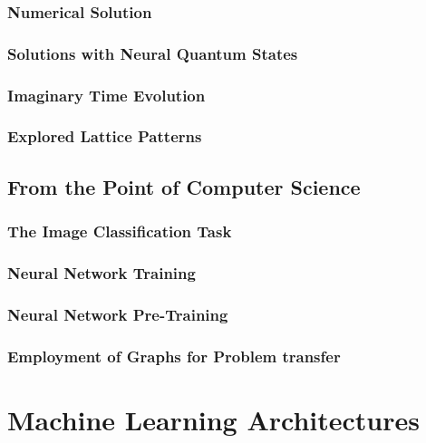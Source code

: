 \documentclass[
headings=optiontohead,              %
12pt,                               %
DIV=13,                             %
twoside=false,                      %
open=right,                         %
BCOR=10mm,                          %
toc=bibliographynumbered            %
]{scrreport}
\begin{document}
        \subsection{Numerical Solution}
        \label{sec:theory-numericalsolution}
        
        \FloatBarrier
        \subsection{Solutions with Neural Quantum States}
        \label{sec:theory-neuralquantumstates}
        \subsection{Imaginary Time Evolution}
        \label{sec:theory-imagenarytimeevolution}
        \subsection{Explored Lattice Patterns}
        \label{sec:theory-latticepatterns}
    \section{From the Point of Computer Science}
        \label{sec:theory-cs}
        
        \FloatBarrier
        \subsection{The Image Classification Task}
        \label{sec:theory-imageclassification}
        \subsection{Neural Network Training}
        \label{sec:theory-neuralnetworktraining}
        \subsection{Neural Network Pre-Training}
        \label{sec:theory-pretraining}
        \subsection{Employment of Graphs for Problem transfer}
        \label{sec:theory-graphs}

\chapter{Machine Learning Architectures}
\label{sec:architectures}
\end{document}
